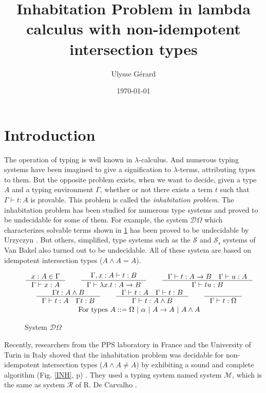 \documentclass{article}
\title{\textbf{Inhabitation Problem in lambda calculus with non-idempotent intersection types}}
\author{Ulysse Gérard}
\date\today
\def\lcalc{$\lambda$-calculus}
\def\lterms{$\lambda$-terms}
\begin{document}
\maketitle

\section{Introduction}
The operation of typing is well known in \lcalc. And numerous typing systems have been imagined to give a signification to \lterms, attributing types to them. But the opposite problem exists, when we want to decide, given a type $A$ and a typing environment $\Gamma$, whether or not there exists a term $t$ such that $\Gamma \vdash t : A$ is provable. This problem is called the \emph{inhabitation problem}.
The inhabitation problem has been studied for numerous type systems and proved to be undecidable for some of them. For example, the system $\mathcal{D}\Omega$ \cite{Kriv} which characterizes solvable terms shown in \ref{SDO} %
has been proved to be undecidable by Urzyczyn \cite{Urz}. But others, simplified, type systems such as the  $\mathcal{S}$ and $\mathcal{S_r}$ systems of Van Bakel \cite{VBak} also turned out to be undecidable. All of these system are based on idempotent intersection types ($A\wedge A = A$).

\begin{figure}
    \begin{mdframed}
        \begin{gather*}
        \inference[]{x : A \in \Gamma}{\Gamma \vdash x : A}
        \qquad
        \inference[]{\Gamma, x : A \vdash t : B}{\Gamma \vdash \lambda x.t : A \rightarrow B}
        \qquad
        \inference[]{\Gamma \vdash t : A \rightarrow B \quad \Gamma \vdash u : A}{\Gamma \vdash tu : B}
        \\
        \inference[]{\Gamma t : A \wedge B}{\Gamma \vdash t : A \quad \Gamma t : B}
        \qquad
        \inference[]{\Gamma \vdash t : A \quad \Gamma \vdash t : B}{\Gamma \vdash t : A \wedge B}
        \qquad
        \inference[]{}{\Gamma \vdash t : \Omega}
        \\ \text{For types } A ::= \Omega \ | \ \alpha \ | \ A \rightarrow A \ | \ A \wedge A
        \end{gather*}
    \end{mdframed}
    \caption{System $\mathcal{D}\Omega$}
    \label{SDO}
\end{figure}

Recently, researchers from the PPS laboratory in France and the University of Turin in Italy shoved that the inhabitation problem was decidable for non-idempotent intersection types ($A\wedge A\neq A$) by exhibiting a sound and complete algorithm (Fig. \ref{INH}, p\pageref{INH}) \cite{Kes}. They used a typing system named system $\mathcal{M}$, which is the same as system $\mathcal{R}$ of R. De Carvalho \cite{DeCarvalho}.
\end{document}
